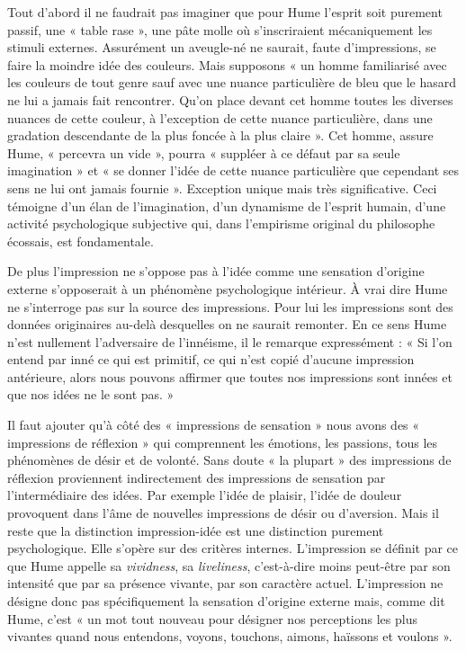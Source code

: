 Tout d’abord il ne faudrait pas imaginer que pour
Hume l'esprit soit purement passif, une « table rase »,
une pâte molle où s’inscriraient mécaniquement les stimuli
externes. Assurément un aveugle-né ne saurait, faute
d’impressions, se faire la moindre idée des couleurs. Mais
supposons « un homme familiarisé avec les couleurs de
tout genre sauf avec une nuance particulière de bleu que
le hasard ne lui a jamais fait rencontrer. Qu’on place
devant cet homme toutes les diverses nuances de cette
couleur, à l’exception de cette nuance particulière, dans
une gradation descendante de la plus foncée à la plus
claire ». Cet homme, assure Hume, « percevra un vide »,
pourra « suppléer à ce défaut par sa seule imagination »
et « se donner l’idée de cette nuance particulière que
cependant ses sens ne lui ont jamais fournie ». Exception
unique mais très significative. Ceci témoigne d’un élan
de l'imagination, d’un dynamisme de l'esprit humain,
d’une activité psychologique subjective qui, dans l’empirisme original du philosophe écossais, est fondamentale.

De plus l'impression ne s’oppose pas à l’idée comme
une sensation d’origine externe s’opposerait à un phénomène psychologique intérieur. À vrai dire Hume ne
s’interroge pas sur la source des impressions. Pour lui les
impressions sont des données originaires au-delà
desquelles on ne saurait remonter. En ce sens Hume n’est
nullement l’adversaire de l’innéisme, il le remarque
expressément : « Si l’on entend par inné ce qui est primitif,
ce qui n’est copié d'aucune impression antérieure, alors
nous pouvons affirmer que toutes nos impressions sont
innées et que nos idées ne le sont pas. »

Il faut ajouter qu’à côté des « impressions de sensation »
nous avons des  « impressions de réflexion » qui comprennent
les émotions, les passions, tous les phénomènes de
désir et de volonté. Sans doute « la plupart » des impressions de réflexion proviennent indirectement des impressions de sensation par l'intermédiaire des idées. Par
exemple l’idée de plaisir, l’idée de douleur provoquent dans
l’âme de nouvelles impressions de désir ou d’aversion.
Mais il reste que la distinction impression-idée est une
distinction purement psychologique. Elle s’opère sur des
critères internes. L’impression se définit par ce que Hume
appelle sa {\it vividness}, sa {\it liveliness}, c’est-à-dire
moins peut-être par son intensité que par sa présence vivante, par son
caractère actuel. L’impression ne désigne donc pas spécifiquement
la sensation d’origine externe mais, comme dit
Hume, c’est « un mot tout nouveau pour désigner nos
perceptions les plus vivantes quand nous entendons,
voyons, touchons, aimons, haïssons et voulons ».

